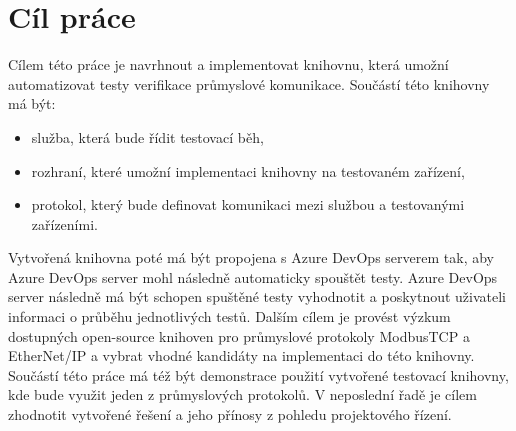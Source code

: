 \chapter{Cíl práce}\label{chap:cil}
Cílem této práce je navrhnout a implementovat knihovnu, která umožní automatizovat testy verifikace průmyslové komunikace. 
Součástí této knihovny má být:
\begin{itemize}
    \item služba, která bude řídit testovací běh,
    \item rozhraní, které umožní implementaci knihovny na testovaném zařízení,
    \item protokol, který bude definovat komunikaci mezi službou a testovanými zařízeními.
\end{itemize}
Vytvořená knihovna poté má být propojena s Azure DevOps serverem tak, aby Azure DevOps server mohl následně automaticky spouštět testy. Azure DevOps server následně má být schopen spuštěné testy vyhodnotit a poskytnout uživateli informaci o průběhu jednotlivých testů. 
Dalším cílem je provést výzkum dostupných open-source knihoven pro průmyslové protokoly ModbusTCP a EtherNet/IP a vybrat vhodné kandidáty na implementaci do této knihovny. 
Součástí této práce má též být demonstrace použití vytvořené testovací knihovny, kde bude využit jeden z průmyslových protokolů. V neposlední řadě je cílem zhodnotit vytvořené řešení a jeho přínosy z pohledu projektového řízení.